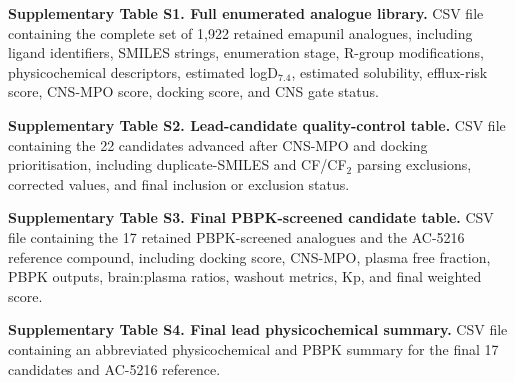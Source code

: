 \documentclass[times, twoside]{zHenriquesLab-StyleBioRxiv}
\begin{document}
	\textbf{Supplementary Table S1. Full enumerated analogue library.}
	CSV file containing the complete set of 1,922 retained emapunil analogues, including ligand identifiers, SMILES strings, enumeration stage, R-group modifications, physicochemical descriptors, estimated logD$_{7.4}$, estimated solubility, efflux-risk score, CNS-MPO score, docking score, and CNS gate status.
	
	\textbf{Supplementary Table S2. Lead-candidate quality-control table.}
	CSV file containing the 22 candidates advanced after CNS-MPO and docking prioritisation, including duplicate-SMILES and CF/CF$_2$ parsing exclusions, corrected values, and final inclusion or exclusion status.
	
	\textbf{Supplementary Table S3. Final PBPK-screened candidate table.}
	CSV file containing the 17 retained PBPK-screened analogues and the AC-5216 reference compound, including docking score, CNS-MPO, plasma free fraction, PBPK outputs, brain:plasma ratios, washout metrics, Kp, and final weighted score.
	
	\textbf{Supplementary Table S4. Final lead physicochemical summary.}
	CSV file containing an abbreviated physicochemical and PBPK summary for the final 17 candidates and AC-5216 reference.
		
	
\end{document}
